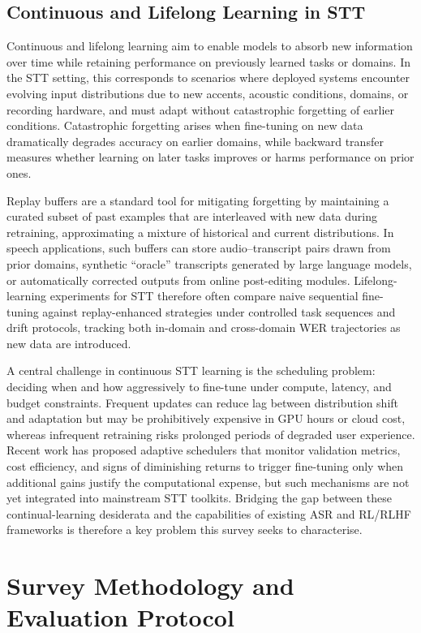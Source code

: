 \documentclass[conference]{IEEEtran}
\begin{document}
\subsection{Continuous and Lifelong Learning in STT}

Continuous and lifelong learning aim to enable models to absorb new information over time while retaining performance on previously learned tasks or domains. In the STT setting, this corresponds to scenarios where deployed systems encounter evolving input distributions due to new accents, acoustic conditions, domains, or recording hardware, and must adapt without catastrophic forgetting of earlier conditions. Catastrophic forgetting arises when fine-tuning on new data dramatically degrades accuracy on earlier domains, while backward transfer measures whether learning on later tasks improves or harms performance on prior ones.

Replay buffers are a standard tool for mitigating forgetting by maintaining a curated subset of past examples that are interleaved with new data during retraining, approximating a mixture of historical and current distributions. In speech applications, such buffers can store audio–transcript pairs drawn from prior domains, synthetic “oracle” transcripts generated by large language models, or automatically corrected outputs from online post-editing modules. Lifelong-learning experiments for STT therefore often compare naive sequential fine-tuning against replay-enhanced strategies under controlled task sequences and drift protocols, tracking both in-domain and cross-domain WER trajectories as new data are introduced.

A central challenge in continuous STT learning is the scheduling problem: deciding when and how aggressively to fine-tune under compute, latency, and budget constraints. Frequent updates can reduce lag between distribution shift and adaptation but may be prohibitively expensive in GPU hours or cloud cost, whereas infrequent retraining risks prolonged periods of degraded user experience. Recent work has proposed adaptive schedulers that monitor validation metrics, cost efficiency, and signs of diminishing returns to trigger fine-tuning only when additional gains justify the computational expense, but such mechanisms are not yet integrated into mainstream STT toolkits. Bridging the gap between these continual-learning desiderata and the capabilities of existing ASR and RL/RLHF frameworks is therefore a key problem this survey seeks to characterise.

\section{Survey Methodology and Evaluation Protocol}
\end{document}
